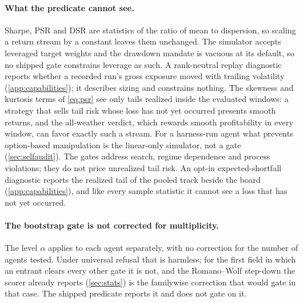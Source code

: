 \paragraph{What the predicate cannot see.} Sharpe, PSR and DSR are statistics of the ratio of mean to dispersion, so scaling a return stream by a constant leaves them unchanged. The simulator accepts leveraged target weights and the drawdown mandate is vacuous at its default, so no shipped gate constrains leverage as such. A rank-neutral replay diagnostic reports whether a recorded run's gross exposure moved with trailing volatility (\cref{app:capabilities}); it describes sizing and constrains nothing. The skewness and kurtosis terms of \cref{eq:psr} see only tails realized inside the evaluated windows: a strategy that sells tail risk whose loss has not yet occurred presents smooth returns, and the all-weather verdict, which rewards smooth profitability in every window, can favor exactly such a stream. For a harness-run agent what prevents option-based manipulation is the linear-only simulator, not a gate (\cref{sec:selfaudit}). The gates address search, regime dependence and process violations; they do not price unrealized tail risk. An opt-in expected-shortfall diagnostic reports the realized tail of the pooled track beside the board (\cref{app:capabilities}), and like every sample statistic it cannot see a loss that has not yet occurred.

\paragraph{The bootstrap gate is not corrected for multiplicity.} The level $\alpha$ applies to each agent separately, with no correction for the number of agents tested. Under universal refusal that is harmless; for the first field in which an entrant clears every other gate it is not, and the Romano--Wolf step-down the scorer already reports (\cref{sec:stats}) is the familywise correction that would gate in that case. The shipped predicate reports it and does not gate on it.


